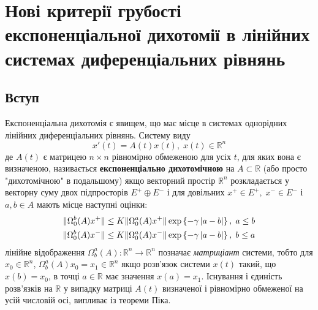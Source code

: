 \documentclass{SHVpaper}
\begin{document}

\section{
Нові критерії грубості експоненціальної дихотомії в лінійних системах диференціальних рівнянь
}



\subsection{Вступ}
Експоненціальна дихотомія є явищем, що має місце в системах однорідних лінійних диференціальних рівнянь. 
Систему виду 
\begin{equation}x'(t)=A(t)x(t),\;x(t)\in\mathbb{R}^n\end{equation}
де $A(t)$ є матрицею $n\times n$ рівномірно обмеженою для усіх $t$, для яких вона є визначеною,
називається \textbf{експоненціально дихотомічною} на $A\subset\mathbb{R}$
(або просто "дихотомічною" в подальшому) якщо векторний простір $\mathbb{R}^n$ розкладається
у векторну суму двох підпросторів $E^+\oplus E^-$ і для довільних $x^+\in E^+,\; x^-\in E^-$ і $a,b\in A$ мають місце наступні оцінки:
\begin{equation}\begin{aligned}\label{DichotomyDef}
	\|\Omega^b_0(A)x^+\|\leq K\|\Omega_0^a(A)x^+\|\exp\left\{-\gamma\left|a-b\right|\right\},\;a\leq b\\
	\|\Omega^b_0(A)x^-\|\leq K\|\Omega_0^a(A)x^-\|\exp\left\{-\gamma\left|a-b\right|\right\},\;b\leq a\\
\end{aligned}\end{equation}
лінійне відображення $\Omega^a_b(A):\mathbb{R}^n\to\mathbb{R}^n$ позначає \textit{матриціант} системи, тобто для$x_0\in\mathbb{R}^n$, 
$\Omega^a_b(A)x_0=x_1\in\mathbb{R}^n$ якщо розв’язок системи $x(t)$ такий, що $x(b)=x_0$, в точці $a\in\mathbb{R}$ має
значення $x(a)=x_1$. Існування і єдиність розв’язків на $\mathbb{R}$ у випадку матриці $A(t)$ визначеної і рівномірно обмеженої на
усій числовій осі, випливає із теореми Піка.
\end{document}
